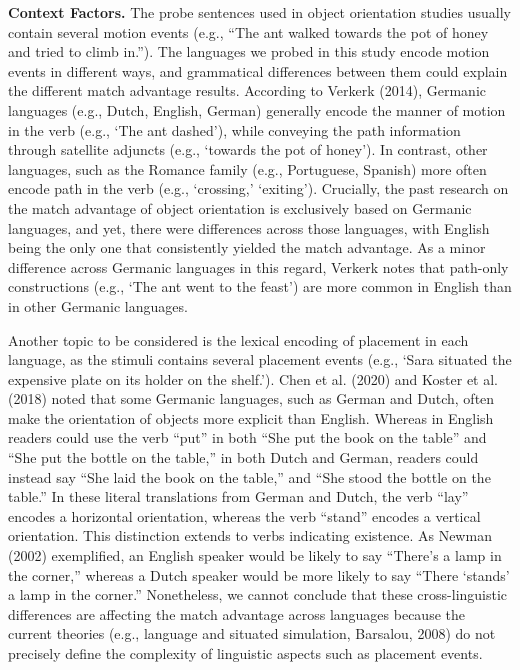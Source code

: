 \documentclass[
  man]{apa7}
\begin{document}
\textbf{Context Factors.} The probe sentences used in object orientation studies usually contain several motion events (e.g., ``The ant walked towards the pot of honey and tried to climb in.''). The languages we probed in this study encode motion events in different ways, and grammatical differences between them could explain the different match advantage results. According to Verkerk (2014), Germanic languages (e.g., Dutch, English, German) generally encode the manner of motion in the verb (e.g., `The ant dashed'), while conveying the path information through satellite adjuncts (e.g., `towards the pot of honey'). In contrast, other languages, such as the Romance family (e.g., Portuguese, Spanish) more often encode path in the verb (e.g., `crossing,' `exiting'). Crucially, the past research on the match advantage of object orientation is exclusively based on Germanic languages, and yet, there were differences across those languages, with English being the only one that consistently yielded the match advantage. As a minor difference across Germanic languages in this regard, Verkerk notes that path-only constructions (e.g., `The ant went to the feast') are more common in English than in other Germanic languages.

Another topic to be considered is the lexical encoding of placement in each language, as the stimuli contains several placement events (e.g., `Sara situated the expensive plate on its holder on the shelf.'). Chen et al. (2020) and Koster et al. (2018) noted that some Germanic languages, such as German and Dutch, often make the orientation of objects more explicit than English. Whereas in English readers could use the verb ``put'' in both ``She put the book on the table'' and ``She put the bottle on the table,'' in both Dutch and German, readers could instead say ``She laid the book on the table,'' and ``She stood the bottle on the table.'' In these literal translations from German and Dutch, the verb ``lay'' encodes a horizontal orientation, whereas the verb ``stand'' encodes a vertical orientation. This distinction extends to verbs indicating existence. As Newman (2002) exemplified, an English speaker would be likely to say ``There's a lamp in the corner,'' whereas a Dutch speaker would be more likely to say ``There `stands' a lamp in the corner.'' Nonetheless, we cannot conclude that these cross-linguistic differences are affecting the match advantage across languages because the current theories (e.g., language and situated simulation, Barsalou, 2008) do not precisely define the complexity of linguistic aspects such as placement events.
\end{document}
